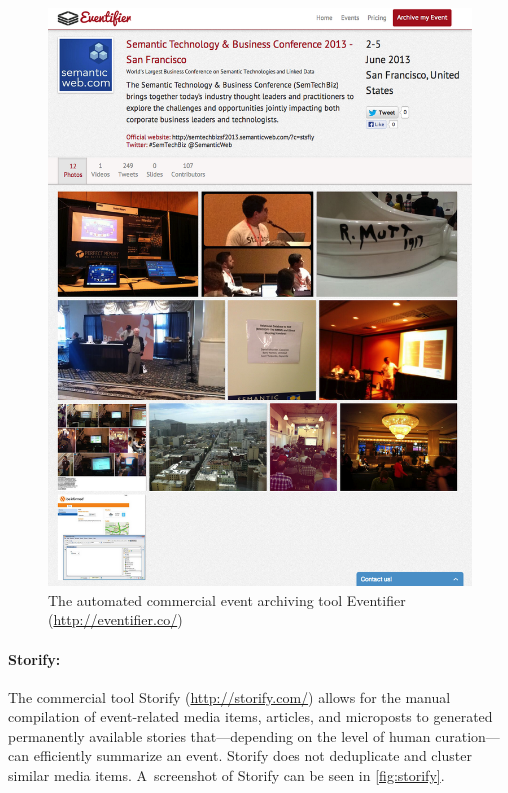 \begin{figure}
  \centering
  \includegraphics[width=\linewidth]{eventifier.png}
  \caption[The automated commercial event archiving tool Eventifier]{The automated commercial event archiving tool Eventifier
    (\url{http://eventifier.co/})}
  \label{fig:eventifier}
\end{figure}

\paragraph{Storify:}

The commercial tool Storify (\url{http://storify.com/})
allows for the manual compilation of
event-related media items, articles, and microposts
to generated permanently available stories
that---depending on the level of human curation---%
can efficiently summarize an event.
Storify does not deduplicate and cluster
similar media items.
A~screenshot of Storify can be seen in \autoref{fig:storify}.

